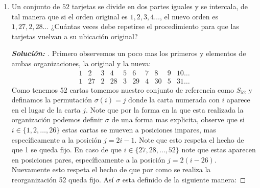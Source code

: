 \documentclass[12pt]{article}
\begin{document}
\begin{enumerate}
\begin{proof}[\textbf{Solución: }]
\begin{itemize}
         $$\begin{matrix}
              &\alpha& &\beta& \\
            1 &\to &5&\to   &5\\
            2 &\to &7&\to   &2\\
            3 &\to &6&\to   &4\\
            4 &\to &3&\to   &7\\
            5 &\to &1&\to   &3\\
            6 &\to &2&\to   &1\\
            7 &\to &4&\to   &6\\
        \end{matrix}$$
         Luego en notación de arreglo es:
        $$\beta\alpha=\begin{pmatrix}
        1&2&3&4&5&6&7\\
        5&2&4&7&3&1&6\\
    \end{pmatrix}$$
    Y los ciclos son:
    \begin{align*}
        &1\to5\to3\to4\to7\to6\to1\\
        &2\to2
    \end{align*}
    Por lo que $\beta\alpha=(153476)(2)$, así esta compuesto por un $1-ciclo$ y un $6-ciclo$, luego $|\beta\alpha|=\text{mcm}(1,6)=6$
    \end{itemize}  
    \end{proof}
    \item Un conjunto de $52$ tarjetas se divide en dos partes iguales y se intercala, de tal manera que si el orden original es $1,2,3,4\dots$, el nuevo orden es $1,27,2,28\dots$ ¿Cuántas veces debe repetirse el procedimiento para que las tarjetas vuelvan a su
ubicación original?
\begin{proof}[\textbf{Solución: }]Primero observemos un poco mas los primeros y  elementos de ambas organizaciones, la original y la nueva:
$$\begin{matrix}
    1&2&3&4&5&6&7&8&9&10\dots\\
    1&27&2&28&3&29&4&30&5&31\dots
\end{matrix}$$
 Como tenemos 52 cartas tomemos nuestro conjunto de referencia como $S_{52}$ y definamos la permutación $\sigma(i)=j$ donde la carta numerada con $i$ aparece en el lugar de la carta $j$. Note que por la forma en la que esta realizada la organización podemos definir $\sigma$ de una forma mas explicita, observe que si $i\in\{1,2,\dots,26\}$ estas cartas se mueven a posiciones impares, mas específicamente a la posición $j=2i-1$. Note que esto respeta el hecho de que 1 se queda fijo. En caso de que $i\in\{27,28,\dots,52\}$ note que estas aparecen en posiciones pares, específicamente a la posición $j=2(i-26)$. Nuevamente esto respeta el hecho de que por como se realiza la reorganización 52 queda fijo. Así $\sigma$ esta definido de la siguiente manera:

\end{proof}
\end{enumerate}
\end{document}
